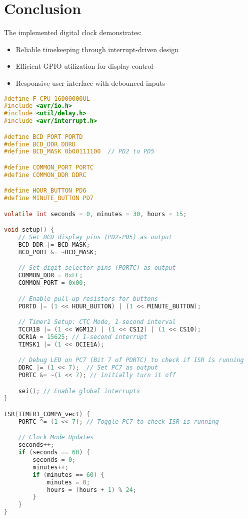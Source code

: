 \documentclass[journal]{IEEEtran}
\begin{document}
\section{Conclusion}
The implemented digital clock demonstrates:
\begin{itemize}
    \item Reliable timekeeping through interrupt-driven design
    \item Efficient GPIO utilization for display control
    \item Responsive user interface with debounced inputs
\end{itemize}


\begin{lstlisting}[language=C,caption=Complete Source Code]
#define F_CPU 16000000UL
#include <avr/io.h>
#include <util/delay.h>
#include <avr/interrupt.h>

#define BCD_PORT PORTD
#define BCD_DDR DDRD
#define BCD_MASK 0b00111100  // PD2 to PD5

#define COMMON_PORT PORTC
#define COMMON_DDR DDRC

#define HOUR_BUTTON PD6
#define MINUTE_BUTTON PD7

volatile int seconds = 0, minutes = 30, hours = 15;

void setup() {
    // Set BCD display pins (PD2-PD5) as output
    BCD_DDR |= BCD_MASK;
    BCD_PORT &= ~BCD_MASK;

    // Set digit selector pins (PORTC) as output
    COMMON_DDR = 0xFF;
    COMMON_PORT = 0x00;

    // Enable pull-up resistors for buttons
    PORTD |= (1 << HOUR_BUTTON) | (1 << MINUTE_BUTTON);

    // Timer1 Setup: CTC Mode, 1-second interval
    TCCR1B |= (1 << WGM12) | (1 << CS12) | (1 << CS10);
    OCR1A = 15625; // 1-second interrupt
    TIMSK1 |= (1 << OCIE1A);

    // Debug LED on PC7 (Bit 7 of PORTC) to check if ISR is running
    DDRC |= (1 << 7);  // Set PC7 as output
    PORTC &= ~(1 << 7); // Initially turn it off

    sei(); // Enable global interrupts
}

ISR(TIMER1_COMPA_vect) {
    PORTC ^= (1 << 7); // Toggle PC7 to check ISR is running

    // Clock Mode Updates
    seconds++;
    if (seconds == 60) {
        seconds = 0;
        minutes++;
        if (minutes == 60) {
            minutes = 0;
            hours = (hours + 1) % 24;
        }
    }
}


\end{lstlisting}
\end{document}
